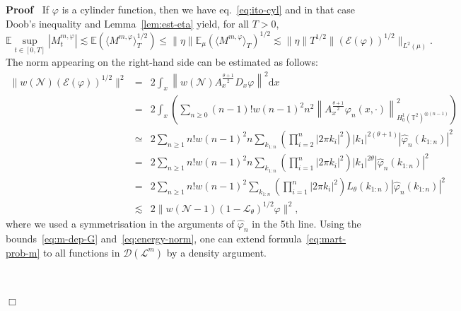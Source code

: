 \documentclass{article}
\newcommand{\mathd}{\mathrm{d}}
\newenvironment{proof}{\noindent\textbf{Proof\ }}{\hspace*{\fill}$\Box$\medskip}
\begin{document}
\begin{proof}
  If $\varphi$ is a cylinder function, then we have eq.~{\eqref{eq:ito-cyl}}
  and in that case Doob's inequality and Lemma~\ref{lem:est-eta} yield, for
  all $T > 0$,
  \[ \mathbb{E} \sup_{t \in [0, T]} | M_t^{m, \varphi} | \lesssim \mathbb{E}
     (\langle M^{m, \varphi} \rangle_T^{1 / 2}) \leqslant \| \eta \|
     \mathbb{E}_{\mu} (\langle M^{m, \varphi} \rangle_T)^{1 / 2} \lesssim \|
     \eta \| T^{1 / 2} \| (\mathcal{E} (\varphi))^{1 / 2} \|_{L^2 (\mu)} . \]
  The norm appearing on the right-hand side can be estimated as follows:
  \begin{eqnarray*}
    \| w (\mathcal{N}) (\mathcal{E} (\varphi))^{1 / 2} \|^2 & = & 2 \int_x
    \left\| w (\mathcal{N}) A^{\frac{\theta + 1}{2}}_x D_x \varphi \right\|^2
    \mathd x\\
    & = & 2 \int_x \left( \sum_{n \geq 0} (n - 1) !w (n - 1)^2 n^2 \left\|
    A^{\frac{\theta + 1}{2}}_x \varphi_n (x, \cdot) \right\|^2_{H^1_0
    (\mathbb{T}^2)^{\otimes (n - 1)}} \right)\\
    & \simeq & 2 \sum_{n \geq 1} n!w (n - 1)^2 n \sum_{k_{1 : n}} \left(
    \prod_{i = 2}^n | 2 \pi k_i |^2 \right) | k_1 |^{2 (\theta + 1)} |
    \hat{\varphi}_n (k_{1 : n}) |^2\\
    & = & 2 \sum_{n \geq 1} n!w (n - 1)^2 n \sum_{k_{1 : n}} \left( \prod_{i
    = 1}^n | 2 \pi k_i |^2 \right) | k_1 |^{2 \theta} | \hat{\varphi}_n (k_{1
    : n}) |^2\\
    & = & 2 \sum_{n \geq 1} n!w (n - 1)^2 \sum_{k_{1 : n}} \left( \prod_{i =
    1}^n | 2 \pi k_i |^2 \right) L_{\theta} (k_{1 : n}) | \hat{\varphi}_n
    (k_{1 : n}) |^2\\
    & \lesssim & 2 \| w (\mathcal{N}- 1) (1 -\mathcal{L}_{\theta})^{1 / 2}
    \varphi \|^2,
  \end{eqnarray*}
  where we used a symmetrisation in the arguments of $\hat{\varphi}_n$ in the
  5th line. Using the bounds~{\eqref{eq:m-dep-G}}
  and~{\eqref{eq:energy-norm}}, one can extend
  formula~{\eqref{eq:mart-prob-m}} to all functions in $\mathcal{D}
  (\mathcal{L}^m)$ by a density argument.
  
  \
  

\end{proof}
\end{document}
